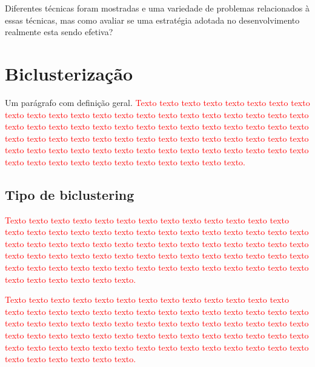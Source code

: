 \documentclass[normaltoc, espacoumemeio, pnumromarab,ruledheader]{abnt}
\begin{document}

Diferentes técnicas foram mostradas e uma variedade de problemas relacionados à essas técnicas, mas como avaliar se uma estratégia adotada no desenvolvimento realmente esta sendo efetiva?

\section{Biclusterização}

Um parágrafo com definição geral. \textcolor{red}{Texto texto texto texto texto texto texto texto texto texto texto texto texto texto texto texto texto texto texto texto texto texto texto texto texto texto texto texto texto texto texto texto texto texto texto texto texto texto texto texto texto texto texto texto texto texto texto texto texto texto texto texto texto texto texto texto texto texto texto texto texto texto texto texto texto texto texto texto texto texto texto texto texto texto texto.}

   \subsection{Tipo de biclustering}
	
	\textcolor{red}{Texto texto texto texto texto texto texto texto texto texto texto texto texto texto texto texto texto texto texto texto texto texto texto texto texto texto texto texto texto texto texto texto texto texto texto texto texto texto texto texto texto texto texto texto texto texto texto texto texto texto texto texto texto texto texto texto texto texto texto texto texto texto texto texto texto texto texto texto texto texto texto texto texto texto texto.}
	
	\textcolor{red}{Texto texto texto texto texto texto texto texto texto texto texto texto texto texto texto texto texto texto texto texto texto texto texto texto texto texto texto texto texto texto texto texto texto texto texto texto texto texto texto texto texto texto texto texto texto texto texto texto texto texto texto texto texto texto texto texto texto texto texto texto texto texto texto texto texto texto texto texto texto texto texto texto texto texto texto.}
	
\end{document}
